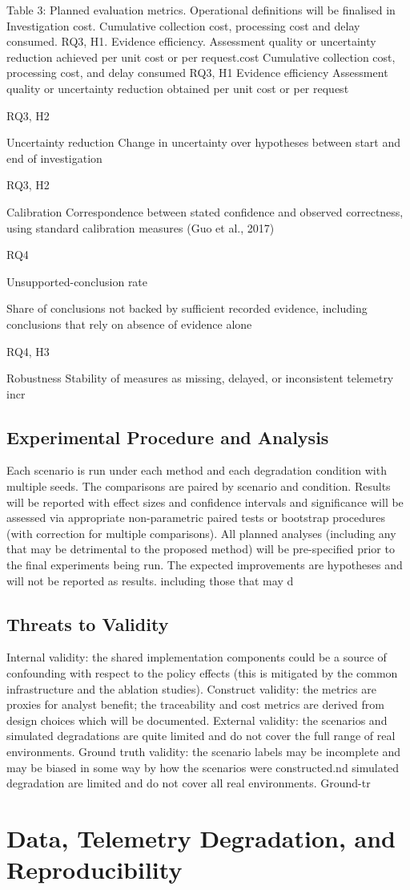 \documentclass[a4paper,11pt]{article}
\begin{document}
Table 3: Planned evaluation metrics. Operational definitions will be finalised in Investigation cost. Cumulative collection cost, processing cost and delay consumed. RQ3, H1. Evidence efficiency. Assessment quality or uncertainty reduction achieved per unit cost or per request.cost Cumulative collection cost, processing cost, and delay consumed RQ3, H1 Evidence efficiency Assessment quality or uncertainty reduction obtained per unit cost or per request\par
RQ3, H2\par
Uncertainty reduction Change in uncertainty over hypotheses between start and end of investigation\par
RQ3, H2\par
Calibration Correspondence between stated confidence and observed correctness, using standard calibration measures (Guo et al., 2017)\par
RQ4\par
Unsupported-conclusion rate\par
Share of conclusions not backed by sufficient recorded evidence, including conclusions that rely on absence of evidence alone\par
RQ4, H3\par
Robustness Stability of measures as missing, delayed, or inconsistent telemetry incr\subsection{Experimental Procedure and Analysis}
Each scenario is run under each method and each degradation condition with multiple seeds. The comparisons are paired by scenario and condition. Results will be reported with effect sizes and confidence intervals and significance will be assessed via appropriate non-parametric paired tests or bootstrap procedures (with correction for multiple comparisons). All planned analyses (including any that may be detrimental to the proposed method) will be pre-specified prior to the final experiments being run. The expected improvements are hypotheses and will not be reported as results. including those that may d\subsection{Threats to Validity}
Internal validity: the shared implementation components could be a source of confounding with respect to the policy effects (this is mitigated by the common infrastructure and the ablation studies). Construct validity: the metrics are proxies for analyst benefit; the traceability and cost metrics are derived from design choices which will be documented. External validity: the scenarios and simulated degradations are quite limited and do not cover the full range of real environments. Ground truth validity: the scenario labels may be incomplete and may be biased in some way by how the scenarios were constructed.nd simulated degradation are limited and do not cover all real environments. Ground-tr\section{Data, Telemetry Degradation, and Reproducibility}
\end{document}
